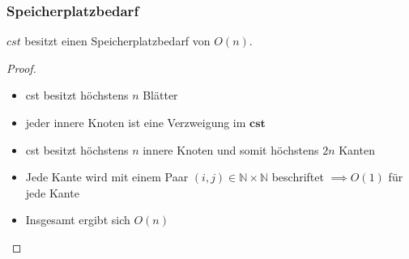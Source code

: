 \documentclass{beamer}
\begin{document}
\begin{frame}
\frametitle{Speicherplatzbedarf}
\begin{lemma}
$cst$ besitzt einen Speicherplatzbedarf von $O(n)$.
\end{lemma}
\begin{proof}
\begin{itemize}
    \item cst besitzt höchstens $n$ Blätter
    \item jeder innere Knoten ist eine Verzweigung im $\boldsymbol{cst}$
    \item cst besitzt höchstens $n$ innere Knoten und somit höchstens $2n$ Kanten
    \item Jede Kante wird mit einem Paar $(i, j) \in \mathbb{N} \times \mathbb{N}$ beschriftet $\implies O(1)$ für jede Kante
    \item Insgesamt ergibt sich $O(n)$
\end{itemize}
\end{proof}
\end{frame}
\end{document}
